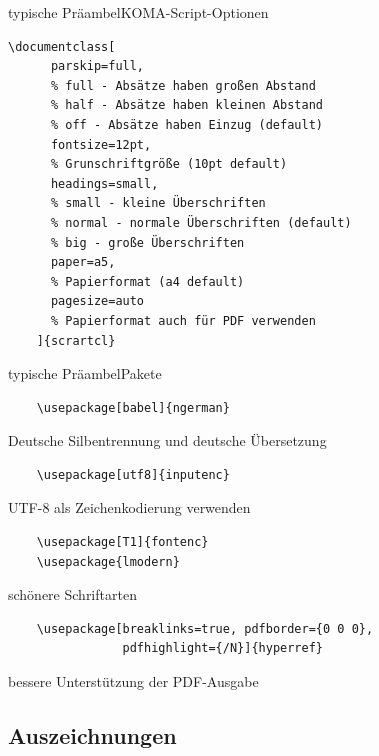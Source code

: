 \begin{Frame}[fragile]{typische Präambel}{KOMA-Script-Optionen}
  \begin{lstlisting}[gobble=4]
    \documentclass[
      parskip=full,
      % full - Absätze haben großen Abstand
      % half - Absätze haben kleinen Abstand
      % off - Absätze haben Einzug (default)
      fontsize=12pt,
      % Grunschriftgröße (10pt default)
      headings=small,
      % small - kleine Überschriften
      % normal - normale Überschriften (default)
      % big - große Überschriften
      paper=a5,
      % Papierformat (a4 default)
      pagesize=auto
      % Papierformat auch für PDF verwenden
    ]{scrartcl}
  \end{lstlisting}
\end{Frame}

\begin{Frame}[fragile]{typische Präambel}{Pakete}
  \begin{lstlisting}
    \usepackage[babel]{ngerman}
  \end{lstlisting}
  Deutsche Silbentrennung und deutsche Übersetzung
  \begin{lstlisting}
    \usepackage[utf8]{inputenc}
  \end{lstlisting}
  UTF-8 als Zeichenkodierung verwenden
  \begin{lstlisting}
    \usepackage[T1]{fontenc}
    \usepackage{lmodern}
  \end{lstlisting}
  schönere Schriftarten
  \begin{lstlisting}
    \usepackage[breaklinks=true, pdfborder={0 0 0},
                pdfhighlight={/N}]{hyperref}
  \end{lstlisting}
  bessere Unterstützung der PDF-Ausgabe
\end{Frame}

\subsection{Auszeichnungen}


